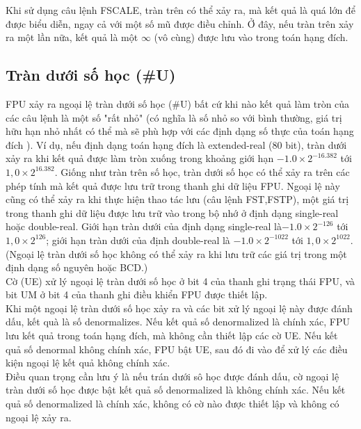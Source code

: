 	Khi sử dụng câu lệnh FSCALE, tràn trên có thể xảy ra, mà kết quả là quá lớn để được biểu diễn, ngay cả với một số mũ được điều chỉnh. Ở đây, nếu tràn trên xảy ra một lần nữa, kết quả là một $\mathbb{\infty}$ (vô cùng) được lưu vào trong toán hạng đích.
	
		\subsection*{Tràn dưới số học (\#U)}
		FPU xảy ra ngoại lệ tràn dưới số học (\#U) bất cứ khi nào kết quả làm tròn của các câu lệnh là một số "rất nhỏ" (có nghĩa là số nhỏ so với bình thường, giá trị hữu hạn nhỏ nhất có thể mà sẽ phù hợp với các định dạng số thực của toán hạng đích ). Ví dụ, nếu định dạng toán hạng đích là extended-real (80 bit), tràn dưới xảy ra khi kết quả được làm tròn xuống trong khoảng giới hạn $-1.0 \times 2^{-16.382}$ tới $1,0 \times 2^{16.382}$. Giống như tràn trên số học, tràn dưới số học có thể xảy ra trên các phép tính mà kết quả được lưu trữ trong thanh ghi dữ liệu FPU. Ngoại lệ này cũng có thể xảy ra khi thực hiện thao tác lưu (câu lệnh FST,FSTP),  một giá trị trong thanh ghi dữ liệu được lưu trữ vào trong bộ nhớ ở định dạng single-real hoặc double-real. Giới hạn tràn dưới của định dạng single-real là$-1.0 \times 2^{-126}$ tới $1,0 \times 2^{126}$; giới hạn tràn dưới của định double-real là $-1.0 \times 2^{-1022}$ tới $1,0 \times 2^{1022}$. (Ngoại lệ tràn dưới số học không có thể xảy ra khi lưu trữ các giá trị trong một định dạng số nguyên hoặc BCD.)\\
		
		Cờ (UE) xử lý ngoại lệ tràn dưới số học ở bit 4 của thanh ghi trạng thái FPU, và bit UM ở bit 4 của thanh ghi điều khiển FPU được thiết lập.\\
		
		Khi một ngoại lệ tràn dưới số học xảy ra và các bit xử lý ngoại lệ này được đánh dấu, kết quà là số denormalizes. Nếu kết quả số denormalized là chính xác, FPU lưu kết quả trong toán hạng đích, mà không cần thiết lập các cờ UE. Nếu kết quả số denormal không chính xác, FPU bật UE, sau đó đi vào để xử lý các điều kiện ngoại lệ kết quả không chính xác.\\
		
		 Điều quan trọng cần lưu ý là nếu trán dưới sô học được đánh dấu, cờ ngoại lệ tràn dưới số học được bật kết quả số denormalized là không chính xác. Nếu kết quả số denormalized là chính xác, không có cờ nào được thiết lập và không có ngoại lệ xảy ra.\\
		 
